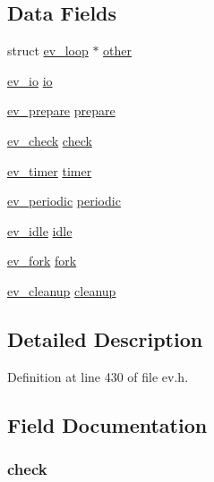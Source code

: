 \subsection*{\-Data \-Fields}
\begin{DoxyCompactItemize}
\item 
struct \hyperlink{structev__loop}{ev\-\_\-loop} $\ast$ \hyperlink{structev__embed_a3079967d5620f0904f31db1f995d74e4}{other}
\item 
\hyperlink{structev__io}{ev\-\_\-io} \hyperlink{structev__embed_a0a60f96152fbb4f3d01c7ef3e4a3d856}{io}
\item 
\hyperlink{structev__prepare}{ev\-\_\-prepare} \hyperlink{structev__embed_a4e3f46ebebe0a3daf2a1f6b8ffef7cb8}{prepare}
\item 
\hyperlink{structev__check}{ev\-\_\-check} \hyperlink{structev__embed_a8e8591c0489d40ffb4c1a9060b39a7f4}{check}
\item 
\hyperlink{structev__timer}{ev\-\_\-timer} \hyperlink{structev__embed_a56d2f62405e7a2bba42204f714803c7c}{timer}
\item 
\hyperlink{structev__periodic}{ev\-\_\-periodic} \hyperlink{structev__embed_a5fbe01d0d9d8a54f2917d9d591496e4f}{periodic}
\item 
\hyperlink{structev__idle}{ev\-\_\-idle} \hyperlink{structev__embed_ae72313f3ce18355b2de897de8aa07b39}{idle}
\item 
\hyperlink{structev__fork}{ev\-\_\-fork} \hyperlink{structev__embed_af379177fda35ffb759d4368f77279c9b}{fork}
\item 
\hyperlink{structev__cleanup}{ev\-\_\-cleanup} \hyperlink{structev__embed_a99d7f2c1ec3aef2e906ac7b6bc63007a}{cleanup}
\end{DoxyCompactItemize}


\subsection{\-Detailed \-Description}


\-Definition at line 430 of file ev.\-h.



\subsection{\-Field \-Documentation}
\hypertarget{structev__embed_a8e8591c0489d40ffb4c1a9060b39a7f4}{
\subsubsection[{check}]{ {\bf check}}}\label{structev__embed_a8e8591c0489d40ffb4c1a9060b39a7f4}


